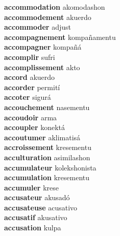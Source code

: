 \textbf{accommodation } akomodashon \\
\textbf{accommodement } akuerdo \\
\textbf{accommoder } adjust \\
\textbf{accompagnement } kompañamentu \\
\textbf{accompagner } kompañá \\
\textbf{accomplir } sufri \\
\textbf{accomplissement } akto \\
\textbf{accord } akuerdo \\
\textbf{accorder } permití \\
\textbf{accoter } sigurá \\
\textbf{accouchement } nasementu \\
\textbf{accoudoir } arma \\
\textbf{accoupler } konektá \\
\textbf{accoutumer } aklimatisá \\
\textbf{accroissement } kresementu \\
\textbf{acculturation } asimilashon \\
\textbf{accumulateur } kolekshonista \\
\textbf{accumulation } kresementu \\
\textbf{accumuler } krese \\
\textbf{accusateur } akusadó \\
\textbf{accusateuse } acusativo \\
\textbf{accusatif } akusativo \\
\textbf{accusation } kulpa \\
